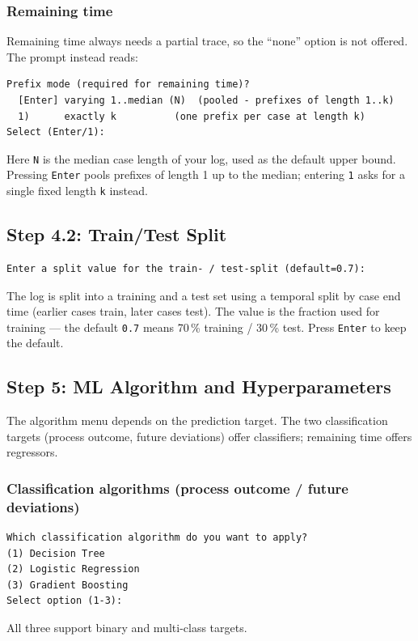 \documentclass[12pt,a4paper]{article}
\begin{document}
\subsubsection{Remaining time}
Remaining time always needs a partial trace, so the ``none'' option is not offered. The prompt instead reads:
\begin{verbatim}
Prefix mode (required for remaining time)?
  [Enter] varying 1..median (N)  (pooled - prefixes of length 1..k)
  1)      exactly k          (one prefix per case at length k)
Select (Enter/1):
\end{verbatim}
Here \texttt{N} is the median case length of your log, used as the default upper bound. Pressing \texttt{Enter} pools prefixes of length 1 up to the median; entering \texttt{1} asks for a single fixed length \texttt{k} instead.

\subsection{Step 4.2: Train/Test Split}
\begin{verbatim}
Enter a split value for the train- / test-split (default=0.7):
\end{verbatim}
The log is split into a training and a test set using a temporal split by case end time (earlier cases train, later cases test). The value is the fraction used for training --- the default \texttt{0.7} means 70\,\% training / 30\,\% test. Press \texttt{Enter} to keep the default.
\subsection{Step 5: ML Algorithm and Hyperparameters}
The algorithm menu depends on the prediction target. The two classification targets (process outcome, future deviations) offer classifiers; remaining time offers regressors.

\subsubsection{Classification algorithms (process outcome / future deviations)}
\begin{verbatim}
Which classification algorithm do you want to apply?
(1) Decision Tree
(2) Logistic Regression
(3) Gradient Boosting
Select option (1-3):
\end{verbatim}
All three support binary and multi-class targets.
\end{document}
